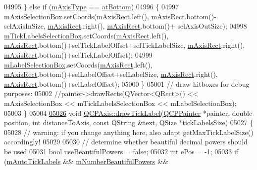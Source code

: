 \begin{DoxyCode}
04995   \} \textcolor{keywordflow}{else} \textcolor{keywordflow}{if} (\hyperlink{a00025_ae704bf9f2c2b026f08dd4ccad79c616e}{mAxisType} == \hyperlink{a00025_ae2bcc1728b382f10f064612b368bc18aa220d68888516b6c3b493d144f1ba438f}{atBottom})
04996   \{
04997     \hyperlink{a00025_a6185814615059cacf09fdb74a3e539d7}{mAxisSelectionBox}.setCoords(\hyperlink{a00025_ad63d51f30f835f3a568b6231362ed4a0}{mAxisRect}.left(), 
      \hyperlink{a00025_ad63d51f30f835f3a568b6231362ed4a0}{mAxisRect}.bottom()-selAxisInSize, \hyperlink{a00025_ad63d51f30f835f3a568b6231362ed4a0}{mAxisRect}.right(), \hyperlink{a00025_ad63d51f30f835f3a568b6231362ed4a0}{mAxisRect}.bottom()+
      selAxisOutSize);
04998     \hyperlink{a00025_acca7a38191c1f4df06b9416d43172214}{mTickLabelsSelectionBox}.setCoords(\hyperlink{a00025_ad63d51f30f835f3a568b6231362ed4a0}{mAxisRect}.left(), 
      \hyperlink{a00025_ad63d51f30f835f3a568b6231362ed4a0}{mAxisRect}.bottom()+selTickLabelOffset+selTickLabelSize, \hyperlink{a00025_ad63d51f30f835f3a568b6231362ed4a0}{mAxisRect}.right(), 
      \hyperlink{a00025_ad63d51f30f835f3a568b6231362ed4a0}{mAxisRect}.bottom()+selTickLabelOffset);
04999     \hyperlink{a00025_a14fbf65daf2c38cbb0f2c4278a7929dd}{mLabelSelectionBox}.setCoords(\hyperlink{a00025_ad63d51f30f835f3a568b6231362ed4a0}{mAxisRect}.left(), 
      \hyperlink{a00025_ad63d51f30f835f3a568b6231362ed4a0}{mAxisRect}.bottom()+selLabelOffset+selLabelSize, \hyperlink{a00025_ad63d51f30f835f3a568b6231362ed4a0}{mAxisRect}.right(), 
      \hyperlink{a00025_ad63d51f30f835f3a568b6231362ed4a0}{mAxisRect}.bottom()+selLabelOffset);
05000   \}
05001   \textcolor{comment}{// draw hitboxes for debug purposes:}
05002   \textcolor{comment}{//painter->drawRects(QVector<QRect>() << mAxisSelectionBox << mTickLabelsSelectionBox <<
       mLabelSelectionBox);}
05003 \}
05004 
\hypertarget{a00115_source_l05026}{}\hyperlink{a00025_a436ea8b8621fa3b897d3ca23b48d990a}{05026} \textcolor{keywordtype}{void} \hyperlink{a00025_a436ea8b8621fa3b897d3ca23b48d990a}{QCPAxis::drawTickLabel}(\hyperlink{a00047}{QCPPainter} *painter, \textcolor{keywordtype}{double} position, \textcolor{keywordtype}{int} 
      distanceToAxis, \textcolor{keyword}{const} QString &text, QSize *tickLabelsSize)
05027 \{
05028   \textcolor{comment}{// warning: if you change anything here, also adapt getMaxTickLabelSize() accordingly!}
05029   
05030   \textcolor{comment}{// determine whether beautiful decimal powers should be used}
05031   \textcolor{keywordtype}{bool} useBeautifulPowers = \textcolor{keyword}{false};
05032   \textcolor{keywordtype}{int} ePos = -1;
05033   \textcolor{keywordflow}{if} (\hyperlink{a00025_a721e496b342f272078c5ff84564e472f}{mAutoTickLabels} && \hyperlink{a00025_af03809bee3f3e35fcc38d25b6dd5003b}{mNumberBeautifulPowers} && 

\end{DoxyCode}
